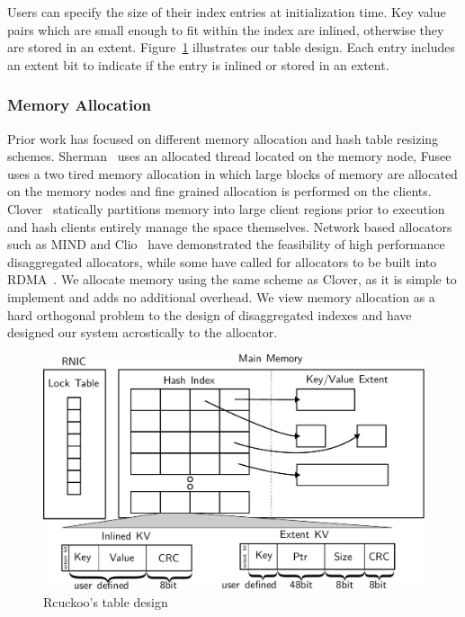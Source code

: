 Users can specify the size of their index entries at
initialization time. Key value pairs which are small enough
to fit within the index are inlined, otherwise they are
stored in an extent. Figure~\ref{fig:table-diagram}
illustrates our table design.  Each entry includes an extent
bit to indicate if the entry is inlined or stored in an
extent. 

\subsubsection{Memory Allocation}

Prior work has focused on different memory allocation and
hash table resizing schemes. Sherman~\cite{sherman} uses an
allocated thread located on the memory node,
Fusee~\cite{fusee} uses a two tired memory allocation in
which large blocks of memory are allocated on the memory
nodes and fine grained allocation is performed on the
clients. Clover~\cite{clover} statically partitions memory
into large client regions prior to execution and hash
clients entirely manage the space themselves. Network based
allocators such as MIND and Clio~\cite{mind,clio} have
demonstrated the feasibility of high performance
disaggregated allocators, while some have called for
allocators to be built into RDMA~\cite{prism}. We allocate
memory using the same scheme as Clover, as it is simple to
implement and adds no additional overhead. We view memory
allocation as a hard orthogonal problem to the design of
disaggregated indexes and have designed our system
acrostically to the allocator.




\begin{figure}[t]
    \includegraphics[width=0.99\linewidth]{fig/table-diagram.pdf}
    \caption{Rcuckoo's table design ~}
    \label{fig:table-diagram}
\end{figure}


